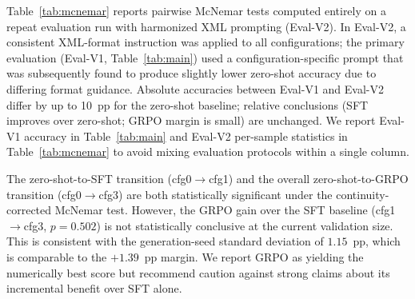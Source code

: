 \documentclass[cmc,journal,article,submit,moreauthors,pdftex]{Definitions/tsp}
\begin{document}
Table~\ref{tab:mcnemar} reports pairwise McNemar tests computed entirely
on a repeat evaluation run with harmonized XML prompting (Eval-V2).
In Eval-V2, a consistent XML-format instruction was applied to all
configurations; the primary evaluation (Eval-V1,
Table~\ref{tab:main}) used a configuration-specific prompt that was
subsequently found to produce slightly lower zero-shot accuracy due to
differing format guidance.
Absolute accuracies between Eval-V1 and Eval-V2 differ by up to 10~pp
for the zero-shot baseline; relative conclusions (SFT improves over
zero-shot; GRPO margin is small) are unchanged.
We report Eval-V1 accuracy in Table~\ref{tab:main} and Eval-V2
per-sample statistics in Table~\ref{tab:mcnemar} to avoid mixing
evaluation protocols within a single column.

The zero-shot-to-SFT transition (cfg0$\to$cfg1) and the overall
zero-shot-to-GRPO transition (cfg0$\to$cfg3) are both statistically
significant under the continuity-corrected McNemar test.
However, the GRPO gain over the SFT baseline (cfg1$\to$cfg3,
$p = 0.502$) is not statistically conclusive at the current validation
size.
This is consistent with the generation-seed standard deviation of
$1.15$~pp, which is comparable to the $+1.39$~pp margin.
We report GRPO as yielding the numerically best score but recommend
caution against strong claims about its incremental benefit over SFT
alone.
\end{document}
